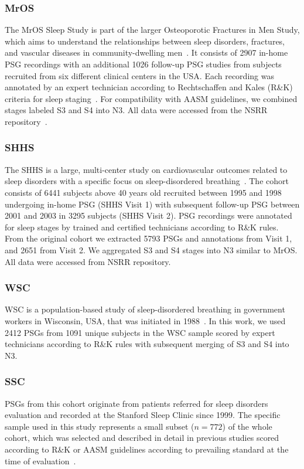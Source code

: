 \subsubsection{\ac{MrOS}}
The \ac{MrOS} Sleep Study is part of the larger Osteoporotic Fractures in Men Study, which aims to understand the relationships between sleep disorders, fractures, and vascular diseases in community-dwelling men~\cite{Blank2005, Orwoll2005, Blackwell2011}. 
It consists of 2907 in-home \ac{PSG} recordings with an additional 1026 follow-up \ac{PSG} studies from subjects recruited from six different clinical centers in the USA.
Each recording was annotated by an expert technician according to Rechtschaffen and Kales (R\&K) criteria for sleep staging~\cite{Rechtschaffen1968}.
For compatibility with \ac{AASM} guidelines, we combined stages labeled S3 and S4 into \ac{N3}. All data were accessed from the \ac{NSRR} repository~\cite{Dean2016, Zhang2018}.

\subsubsection{\ac{SHHS}}
The \ac{SHHS} is a large, multi-center study on cardiovascular outcomes related to sleep disorders with a specific focus on sleep-disordered breathing~\cite{Quan1997, Redline1998}.
The cohort consists of 6441 subjects above 40 years old recruited between 1995 and 1998 undergoing in-home \ac{PSG} (\ac{SHHS} Visit 1) with subsequent follow-up \ac{PSG} between 2001 and 2003 in 3295 subjects (\ac{SHHS} Visit 2).
\ac{PSG} recordings were annotated for sleep stages by trained and certified technicians according to R\&K rules.
From the original cohort we extracted 5793 \acp{PSG} and annotations from Visit 1, and 2651 from Visit 2.
We aggregated S3 and S4 stages into \ac{N3} similar to \ac{MrOS}.
All data were accessed from \ac{NSRR} repository.

\subsubsection{\ac{WSC}}
\ac{WSC} is a population-based study of sleep-disordered breathing in government workers in Wisconsin, USA, that was initiated in 1988~\cite{Young1993, Young2008}.
In this work, we used 2412 \acp{PSG} from 1091 unique subjects in the \ac{WSC} sample scored by expert technicians according to R\&K rules with subsequent merging of S3 and S4 into \ac{N3}.

\subsubsection{\ac{SSC}}
\acp{PSG} from this cohort originate from patients referred for sleep disorders evaluation and recorded at the Stanford Sleep Clinic since 1999.
The specific sample used in this study represents a small subset ($n=772$) of the whole cohort, which was selected and described in detail in previous studies scored according to R\&K or \ac{AASM} guidelines according to prevailing standard at the time of evaluation~\cite{Andlauer2013, Moore2014}. 

